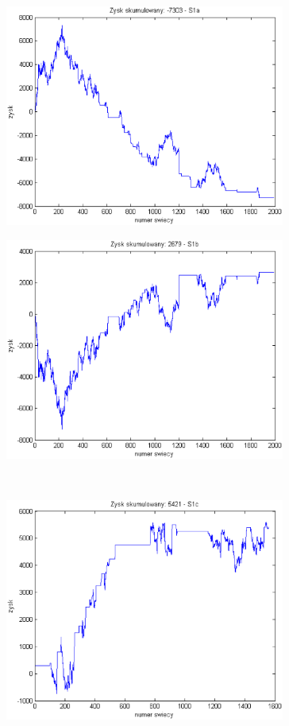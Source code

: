 \documentclass{tewiart}
\begin{document}
\FloatBarrier
\begin{figure}[h]
\centering
\begin{minipage}{.49\linewidth}
\centering
\includegraphics[width=0.82\textwidth]{images/usdcadS1a.eps}
\label{jedno}
\end{minipage}
\begin{minipage}{.49\linewidth}
\centering
\includegraphics[width=0.82\textwidth]{images/usdcadS1b.eps}
\label{dwu}
\end{minipage}
\\
\begin{minipage}{.49\linewidth}
\centering
\includegraphics[width=0.82\textwidth]{images/usdcadS1c.eps}

\end{minipage}
\end{figure}
\end{document}
